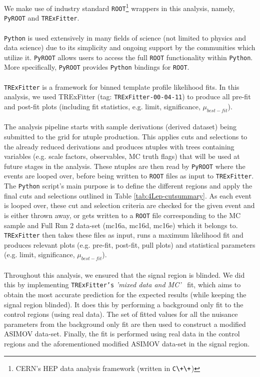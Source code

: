 We make use of industry standard \texttt{ROOT}\footnote{CERN's HEP data analysis framework (written in \texttt{C$\+\+$})} wrappers in this analysis, namely, \texttt{PyROOT} and \texttt{TRExFitter}.\\\\
\texttt{Python} is used extensively in many fields of science (not limited to physics and data science) due to its simplicity and ongoing support by the communities which utilize it. \texttt{PyROOT} allows users to access the full \texttt{ROOT} functionality within \texttt{Python}. More specifically, \texttt{PyROOT} provides \texttt{Python} bindings for \texttt{ROOT}.\\\\
\texttt{TRExFitter} is a framework for binned template profile likelihood fits\cite{TRexfitter}. In this analysis, we used TRExFitter (tag: \texttt{TRExFitter-00-04-11}) to produce all pre-fit and post-fit plots (including fit statistics, e.g. limit, significance, $\mu_{best-fit}$).\\\\
The analysis pipeline starts with sample derivations (derived dataset) being submitted to the grid for ntuple production. This applies cuts and selections to the already reduced derivations and produces ntuples with trees containing variables (e.g. scale factors, observables, MC truth flags) that will be used at future stages in the analysis. These ntuples are then read by \texttt{PyROOT} where the events are looped over, before being written to \texttt{ROOT} files as input to \texttt{TRExFitter}. The \texttt{Python} script's main purpose is to define the different regions and apply the final cuts and selections outlined in Table \ref{tab:4Lep-cutsummary}. As each event is looped over, these cut and selection criteria are checked for the given event and is either thrown away, or gets written to a \texttt{ROOT} file corresponding to the MC sample and Full Run 2 data-set (mc16a, mc16d, mc16e) which it belongs to. \texttt{TRExFitter} then takes these files as input, runs a maximum likelihood fit and produces relevant plots (e.g. pre-fit, post-fit, pull plots) and statistical parameters (e.g. limit, significance, $\mu_{best-fit}$).\\\\
Throughout this analysis, we ensured that the signal region is blinded. We did this by implementing \texttt{TRExFitter's} \textit{'mixed data and MC'}~\cite{MixedDataAndMC_TRF} fit, which aims to obtain the most accurate prediction for the expected results (while keeping the signal region blinded). It does this by performing a background only fit to the control regions (using real data). The set of fitted values for all the nuisance parameters from the background only fit are then used to construct a modified ASIMOV data-set. Finally, the fit is performed using real data in the control regions and the aforementioned modified ASIMOV data-set in the signal region.








